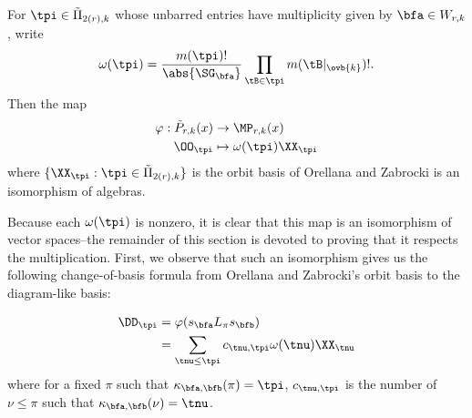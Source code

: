 \begin{theorem}\label{thm:change_of_basis} For $\tpi\in\tilde\Pi_{2(r),k}$ whose unbarred entries have multiplicity given by $\bfa\in W_{r,k}$, write \[\omega(\tpi)=\frac{m(\tpi)!}{\abs{\SG_\bfa}}\prod_{\tB\in\tpi}m(\tB|_{\ovb{k}})!.\] Then the map \begin{align*}
    \varphi:\tilde{P}_{r,k}(x)&\to\MP_{r,k}(x)\\
    \OO_\tpi&\mapsto \omega(\tpi)\XX_\tpi
\end{align*} where $\{\XX_\tpi:\tpi\in\tilde\Pi_{2(r),k}\}$ is the orbit basis of Orellana and Zabrocki is an isomorphism of algebras.
\end{theorem}

Because each $\omega(\tpi)$ is nonzero, it is clear that this map is an isomorphism of vector spaces--the remainder of this section is devoted to proving that it respects the multiplication. First, we observe that such an isomorphism gives us the following change-of-basis formula from Orellana and Zabrocki's orbit basis to the diagram-like basis:

\begin{align*}
    \DD_\tpi&=\varphi(s_\bfa L_\pi s_\bfb)\\
            &=\sum_{\tnu\leq\tpi} c_{\tnu,\tpi}\omega(\tnu)\XX_\tnu
\end{align*} where for a fixed $\pi$ such that $\kappa_{\bfa,\bfb}(\pi)=\tpi$, $c_{\tnu,\tpi}$ is the number of $\nu\leq\pi$ such that $\kappa_{\bfa,\bfb}(\nu)=\tnu$.

